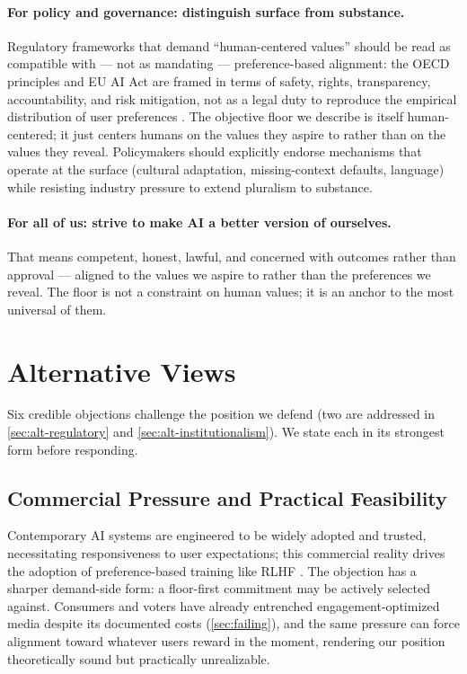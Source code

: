 \documentclass{article}
\theoremstyle{plain}
\theoremstyle{definition}
\theoremstyle{remark}
\begin{document}
\paragraph{For policy and governance: distinguish surface from substance.} Regulatory frameworks that demand ``human-centered values'' should be read as compatible with --- not as mandating --- preference-based alignment: the OECD principles and EU AI Act are framed in terms of safety, rights, transparency, accountability, and risk mitigation, not as a legal duty to reproduce the empirical distribution of user preferences \citep{oecd2019ai, eu2024aiact}. The objective floor we describe is itself human-centered; it just centers humans on the values they aspire to rather than on the values they reveal. Policymakers should explicitly endorse mechanisms that operate at the surface (cultural adaptation, missing-context defaults, language) while resisting industry pressure to extend pluralism to substance.

\paragraph{For all of us: strive to make AI a better version of ourselves.} That means competent, honest, lawful, and concerned with outcomes rather than approval --- aligned to the values we aspire to rather than the preferences we reveal. The floor is not a constraint on human values; it is an anchor to the most universal of them.

\section{Alternative Views}
\label{sec:altview}

Six credible objections challenge the position we defend (two are addressed in \cref{sec:alt-regulatory} and \cref{sec:alt-institutionalism}). We state each in its strongest form before responding.

\subsection{Commercial Pressure and Practical Feasibility}
\label{sec:alt-commercial}
Contemporary AI systems are engineered to be widely adopted and trusted, necessitating responsiveness to user expectations; this commercial reality drives the adoption of preference-based training like RLHF \citep{christiano2017deep, ouyang2022training}. The objection has a sharper demand-side form: a floor-first commitment may be actively selected against. Consumers and voters have already entrenched engagement-optimized media despite its documented costs (\cref{sec:failing}), and the same pressure can force alignment toward whatever users reward in the moment, rendering our position theoretically sound but practically unrealizable.
\end{document}
